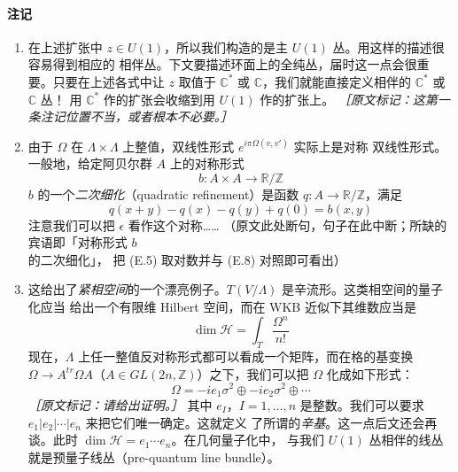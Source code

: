\paragraph{注记}
\begin{enumerate}
  \item 在上述扩张中 $z\in U(1)$，所以我们构造的是主 $U(1)$ 丛。用这样的描述很容易得到相应的
    相伴丛。下文要描述环面上的全纯丛，届时这一点会很重要。只要在上述各式中让 $z$ 取值于
    $\mathbb{C}^*$ 或 $\mathbb{C}$，我们就能直接定义相伴的 $\mathbb{C}^*$ 或 $\mathbb{C}$ 丛！
    用 $\mathbb{C}^*$ 作的扩张会收缩到用 $U(1)$ 作的扩张上。
    {\small\itshape ［原文标记：这第一条注记位置不当，或者根本不必要。］}
  \item 由于 $\Omega$ 在 $\Lambda\times\Lambda$ 上整值，双线性形式 $e^{i\pi\Omega(v,v')}$ 实际上是对称
    双线性形式。一般地，给定阿贝尔群 $A$ 上的对称形式
    \begin{equation}
      b:A\times A\to\mathbb{R}/\mathbb{Z}
      \tag{E.7}
      \label{eq:E.7}
    \end{equation}
    $b$ 的一个\emph{二次细化}（quadratic refinement）是函数 $q:A\to\mathbb{R}/\mathbb{Z}$，满足
    \begin{equation}
      q(x+y)-q(x)-q(y)+q(0)=b(x,y)
      \tag{E.8}
      \label{eq:E.8}
    \end{equation}
    注意我们可以把 $\epsilon$ 看作这个对称……
    （原文此处断句，句子在此中断；所缺的宾语即「对称形式 $b$ 的二次细化」，
    把 (E.5) 取对数并与 (E.8) 对照即可看出）
  \item 这给出了\emph{紧相空间}的一个漂亮例子。$T(V/\Lambda)$ 是辛流形。这类相空间的量子化应当
    给出一个有限维 Hilbert 空间，而在 WKB 近似下其维数应当是
    \begin{equation}
      \dim\mathcal{H} = \int_T\frac{\Omega^n}{n!}
      \tag{E.9}
      \label{eq:E.9}
    \end{equation}
    现在，$\Lambda$ 上任一整值反对称形式都可以看成一个矩阵，而在格的基变换
    $\Omega\to A^{tr}\Omega A$（$A\in GL(2n,\mathbb{Z})$）之下，我们可以把 $\Omega$ 化成如下形式：
    \begin{equation}
      \Omega = -ie_1\sigma^2\oplus -ie_2\sigma^2\oplus\cdots
      \tag{E.10}
      \label{eq:E.10}
    \end{equation}
    {\small\itshape ［原文标记：请给出证明。］}
    其中 $e_I$，$I=1,\dots,n$ 是整数。我们可以要求 $e_1|e_2|\cdots|e_n$ 来把它们唯一确定。这就定义
    了所谓的\emph{辛基}。这一点后文还会再谈。此时 $\dim\mathcal{H}=e_1\cdots e_n$。在几何量子化中，
    与我们 $U(1)$ 丛相伴的线丛就是预量子线丛（pre-quantum line bundle）。
\end{enumerate}

